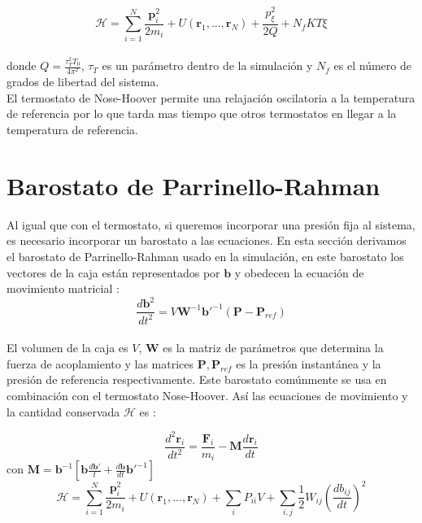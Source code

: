 \begin{equation} \label{conservedNoseHoover}
    \mathcal{H} = \sum_{i=1}^{N}\frac{\mathbf{p}_i^2}{2m_i} + U(\mathbf{r}_1,...,\mathbf{r}_N)+\frac{p_\xi^2}{2Q} + N_fKT\xi
\end{equation}\\

donde $Q=\frac{\tau_T^2 T_0}{4\pi^2}$, $\tau_T$ es un parámetro dentro de la simulación y $N_f$ es el número de grados de libertad del sistema.\\

El termostato de Nose-Hoover permite una relajación oscilatoria a la temperatura de referencia por lo que tarda mas tiempo que otros termostatos en llegar a la temperatura de referencia.\\

\section{Barostato de Parrinello-Rahman}

Al igual que con el termostato, si queremos incorporar una presión fija al sistema, es necesario incorporar un barostato a las ecuaciones. En esta sección derivamos el barostato de Parrinello-Rahman usado en la simulación, en este barostato los vectores de la caja están representados por $\mathbf{b}$ y obedecen la ecuación de movimiento matricial\cite{gromacsdoc} \cite{simone1993}:\\

\begin{equation} \label{parrrahman}
    \frac{d\mathbf{b}^2}{dt^2}=V\mathbf{W}^{-1}\mathbf{b'}^{-1}(\mathbf{P}-\mathbf{P}_{ref})
\end{equation}\\

El volumen de la caja es $V$, $\mathbf{W}$ es la matriz de parámetros que determina la fuerza de acoplamiento y las matrices $\mathbf{P},\mathbf{P}_{ref}$ es la presión instantánea y la presión de referencia respectivamente. Este barostato comúnmente se usa en combinación con el termostato Nose-Hoover. Así las ecuaciones de movimiento y la cantidad conservada $\mathcal{H}$ es \cite{gromacsdoc}:

\begin{equation} \label{NHPRmotionr}
    \frac{d^2\mathbf{r}_i}{dt^2} = \frac{\mathbf{F}_i}{m_i}-\mathbf{M}\frac{d\mathbf{r}_i}{dt}
\end{equation}
con $\mathbf{M}=\mathbf{b}^{-1}\left[\mathbf{b}\frac{d\mathbf{b'}}{t}+\frac{d\mathbf{b}}{dt}\mathbf{b'}^{-1} \right]$
\begin{equation} \label{conservedNoseHooverParrRahm}
    \mathcal{H} = \sum_{i=1}^{N}\frac{\mathbf{p}_i^2}{2m_i} + U(\mathbf{r}_1,...,\mathbf{r}_N) + \sum_i P_{ii}V + \sum_{i,j}\frac{1}{2}W_{ij}\left(\frac{db_{ij}}{dt}\right)^2
\end{equation}\\

